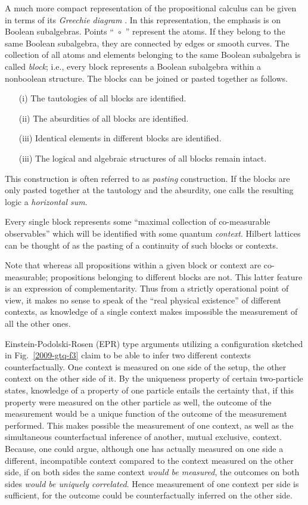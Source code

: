 {A much more compact representation of the propositional calculus can be
given in terms of
its {\em Greechie diagram} \cite{greechie:71}.
In this representation, the emphasis is on Boolean subalgebras.
Points ``~$\circ$~'' represent the atoms.
If they belong to the same Boolean subalgebra, they are connected by edges or smooth curves.
The collection of all atoms and elements belonging to the same Boolean subalgebra is called {\em block};
i.e., every block represents a Boolean subalgebra within a nonboolean structure.
The blocks can be joined or pasted together as follows.
\begin{itemize}
\item[(i)]
The tautologies of all blocks are identified.
\item[(ii)]
The absurdities of all blocks are identified.
\item[(iii)]
Identical elements in different blocks are identified.
\item[(iii)]
The logical and algebraic structures of all blocks remain intact.
\end{itemize}
This construction is often referred to as {\em pasting} construction.
If the blocks are only pasted together at the tautology and
the absurdity, one calls the resulting logic a {\em horizontal
sum}.

Every single block represents some ``maximal collection of co-measurable observables''
which will be identified with some quantum {\em context}.
Hilbert lattices can be thought of as the pasting of a continuity of such blocks or contexts.

Note that whereas all propositions within a given block or context are co-measurable;
propositions belonging to different blocks are not.
This latter feature is an expression of  complementarity.
Thus from a strictly operational point of view,
it makes no sense to speak of the ``real physical existence'' of different contexts,
as knowledge of a single context makes impossible the measurement of all the other ones.

Einstein-Podolski-Rosen (EPR) type arguments \cite{epr} utilizing a configuration
sketched in Fig.~\ref{2009-gtq-f3}
claim to be able to infer two different contexts counterfactually.
One context is measured on one side of the setup, the other context on the other side of it.
By the uniqueness property \cite{svozil-2006-uniquenessprinciple} of certain two-particle states,
knowledge of a property of one particle entails the certainty
that, if this property were measured on the other particle as well, the outcome of the measurement would be
a unique function of the outcome of the measurement performed.
This makes possible the measurement of one context, as well as the simultaneous counterfactual inference of another, mutual exclusive, context.
Because, one could argue, although one has actually measured on one side a different, incompatible context compared to the context measured on the other side,
if on both sides the same  context {\em would be measured}, the outcomes on both sides {\em would be uniquely correlated}.
Hence measurement of one context per side is sufficient, for the outcome could be counterfactually inferred on the other side.

}
